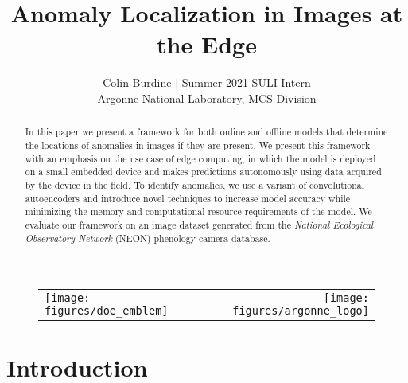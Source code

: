 \documentclass[12pt]{article}
\author{Colin Burdine $|$ Summer 2021 SULI Intern \\[6mm] Argonne National Laboratory, MCS Division}
\title{Anomaly Localization in Images at the Edge }
\begin{document}
\maketitle





\begin{abstract}
In this paper we present a framework for both online and offline models that determine the locations of anomalies in images if they are present.  We present this framework with an emphasis on the use case of edge computing, in which the model is deployed on a small embedded device and makes predictions autonomously using data acquired by the device in the field. To identify anomalies, we use a variant of convolutional autoencoders and introduce novel techniques to increase model accuracy while minimizing the memory and computational resource requirements of the model. We evaluate our framework on an image dataset generated from the \textit{National Ecological Observatory Network} (NEON) phenology camera database.
\end{abstract}

\begin{figure}
\begin{center}
\begin{tabular}{l r}
\texttt{[image: figures/doe\_emblem]} \qquad
& \qquad\texttt{[image: figures/argonne\_logo]} 
\end{tabular}
\end{center}
\end{figure}

\newpage

\tableofcontents
\newpage

\section{Introduction}
\end{document}

